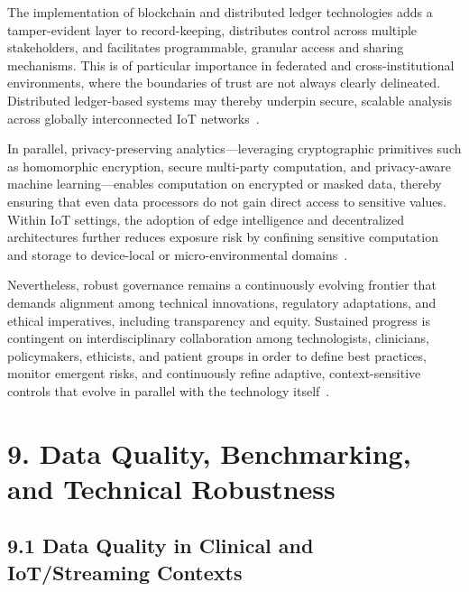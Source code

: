 \documentclass[11pt]{article}
\begin{document}
The implementation of blockchain and distributed ledger technologies adds a tamper-evident layer to record-keeping, distributes control across multiple stakeholders, and facilitates programmable, granular access and sharing mechanisms. This is of particular importance in federated and cross-institutional environments, where the boundaries of trust are not always clearly delineated. Distributed ledger-based systems may thereby underpin secure, scalable analysis across globally interconnected IoT networks~\cite{ref4, ref5, ref10, ref13, ref14, ref16, ref17, ref18, ref19, ref20, ref21, ref22, ref23, ref24, ref25, ref30, ref31, ref33, ref34, ref35, ref44, ref45, ref46, ref50, ref51, ref61, ref62, ref64, ref65, ref76, ref77, ref91, ref106}.

In parallel, privacy-preserving analytics—leveraging cryptographic primitives such as homomorphic encryption, secure multi-party computation, and privacy-aware machine learning—enables computation on encrypted or masked data, thereby ensuring that even data processors do not gain direct access to sensitive values. Within IoT settings, the adoption of edge intelligence and decentralized architectures further reduces exposure risk by confining sensitive computation and storage to device-local or micro-environmental domains~\cite{ref4, ref5, ref10, ref16, ref17, ref18, ref19, ref20, ref21, ref22, ref23, ref24, ref25, ref44, ref45, ref61, ref62, ref64, ref65, ref76, ref77, ref91, ref106}.

Nevertheless, robust governance remains a continuously evolving frontier that demands alignment among technical innovations, regulatory adaptations, and ethical imperatives, including transparency and equity. Sustained progress is contingent on interdisciplinary collaboration among technologists, clinicians, policymakers, ethicists, and patient groups in order to define best practices, monitor emergent risks, and continuously refine adaptive, context-sensitive controls that evolve in parallel with the technology itself~\cite{ref91, ref106}.

\section{9. Data Quality, Benchmarking, and Technical Robustness}

\subsection{9.1 Data Quality in Clinical and IoT/Streaming Contexts}
\end{document}
